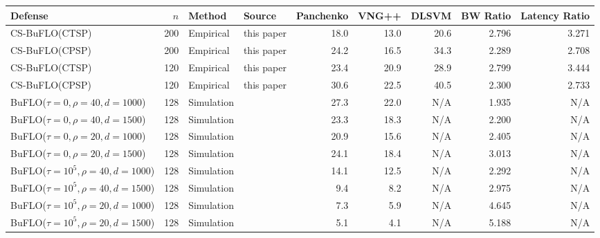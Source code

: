 \documentclass[10pt,journal]{IEEEtran}
\newcommand{\buflo} {BuFLO\xspace}
\newcommand{\csb} {CS-BuFLO\xspace}
\begin{document}
\begin{table*}
\begin{minipage}{\textwidth}                                                                                         
  \begin{center}
  \begin{tabular}{|lrllrrrrr|}
    \hline
    Defense                            & $n$ & Method     & Source                  & Panchenko & VNG++ & DLSVM & BW Ratio & Latency Ratio \\
    \hline
    \hline
    \csb (CTSP)                        & 200 & Empirical  & this paper              & 18.0      & 13.0  & 20.6  & 2.796    & 3.271         \\
    \csb (CPSP)                        & 200 & Empirical  & this paper              & 24.2      & 16.5  & 34.3  & 2.289    & 2.708         \\
    \csb (CTSP)                        & 120 & Empirical  & this paper              & 23.4      & 20.9  & 28.9  & 2.799    & 3.444         \\
    \csb (CPSP)                        & 120 & Empirical  & this paper              & 30.6      & 22.5  & 40.5  & 2.300    & 2.733         \\
    \hline
    \buflo($\tau=0,\rho=40,d=1000$)    & 128 & Simulation & \cite{dyer-snp12}       & 27.3      & 22.0  & N/A   & 1.935    & N/A           \\
    \buflo($\tau=0,\rho=40,d=1500$)    & 128 & Simulation & \cite{dyer-snp12}       & 23.3      & 18.3  & N/A   & 2.200    & N/A           \\
    \buflo($\tau=0,\rho=20,d=1000$)    & 128 & Simulation & \cite{dyer-snp12}       & 20.9      & 15.6  & N/A   & 2.405    & N/A           \\
    \buflo($\tau=0,\rho=20,d=1500$)    & 128 & Simulation & \cite{dyer-snp12}       & 24.1      & 18.4  & N/A   & 3.013    & N/A           \\
    \buflo($\tau=10^5,\rho=40,d=1000$) & 128 & Simulation & \cite{dyer-snp12}       & 14.1      & 12.5  & N/A   & 2.292    & N/A           \\
    \buflo($\tau=10^5,\rho=40,d=1500$) & 128 & Simulation & \cite{dyer-snp12}       & 9.4       & 8.2   & N/A   & 2.975    & N/A           \\
    \buflo($\tau=10^5,\rho=20,d=1000$) & 128 & Simulation & \cite{dyer-snp12}       & 7.3       & 5.9   & N/A   & 4.645    & N/A           \\
    \buflo($\tau=10^5,\rho=20,d=1500$) & 128 & Simulation & \cite{dyer-snp12}       & 5.1       & 4.1   & N/A   & 5.188    & N/A           \\

\end{tabular}
\end{center}
\end{minipage}
\end{table*}
\end{document}
